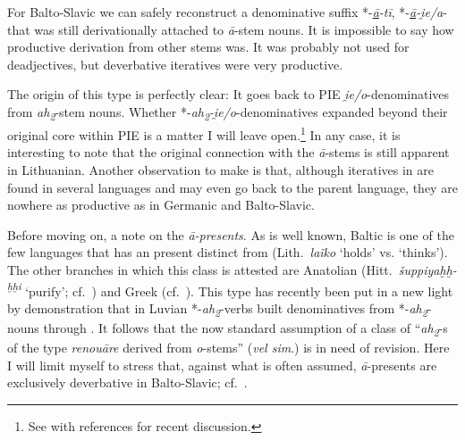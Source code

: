\documentclass[output=paper,colorlinks,citecolor=brown]{langscibook}
\begin{document}
For Balto-Slavic we can safely reconstruct a denominative suffix *-\textit{\underline{ā}-tī}, *-\textit{\underline{ā}\nobreakdash-i̯e/a}- that was still derivationally attached to \textit{ā}-stem nouns. It is impossible to say how productive derivation from other stems was. It was probably not used for deadjectives, but deverbative iteratives were very productive.

The origin of this type is perfectly clear: It goes back to PIE \textit{i̯e/o}-denominatives  from \textit{ah\textsubscript{2}}-stem nouns. Whether *-\textit{ah\textsubscript{2}-i̯e/o}-denominatives expanded beyond their original core within PIE is a matter I will leave open.\footnote{See \citet[126--127]{Sasseville2021} with references for recent discussion.} In any case, it is interesting to note that the original connection with the \textit{ā}-stems is still apparent in Lithuanian. Another observation to make is that, although iteratives in  are found in several languages and may even go back to the parent language, they are nowhere as productive as in Germanic and Balto-Slavic.

Before moving on, a note on the \emph{ā-presents}. As is well known, Baltic is one of the few languages that has an present distinct from  (Lith.\ \textit{laĩko} ‘holds’ vs.  ‘thinks’). The other branches in which this class is attested are Anatolian (Hitt.\ \textit{šuppiyaḫḫ-\textsuperscript{ḫḫi}}   ‘purify’; cf.\ \citealt[140--141]{Jasanoff2003}) and Greek (cf.\ \citealt{Rau2009myc}). This type has recently been put in a new light by  demonstration that in Luvian *-\textit{ah\textsubscript{2}}-verbs built denominatives from *-\textit{ah\textsubscript{2}}-nouns through . It follows that the now standard assumption of a class of “\textit{ah\textsubscript{2}}-s of the type \textit{renouāre} derived from \textit{o}-stems” (\textit{vel sim}.) is in need of revision. Here I will limit myself to stress that, against what is often assumed, \textit{ā}-presents are exclusively deverbative in Balto-Slavic; cf.\ \citet[392--395]{VillanuevaSvensson2020}.
\end{document}
